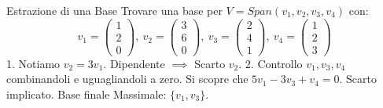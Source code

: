 \begin{example}{Estrazione di una Base}{}
Trovare una base per $V = Span(v_1, v_2, v_3, v_4)$ con:
$$
v_1 = \begin{pmatrix} 1 \\ 2 \\ 0 \end{pmatrix}, \ v_2 = \begin{pmatrix} 3 \\ 6 \\ 0 \end{pmatrix}, \ v_3 = \begin{pmatrix} 2 \\ 4 \\ 1 \end{pmatrix}, \ v_4 = \begin{pmatrix} 1 \\ 2 \\ 3 \end{pmatrix}
$$
1. Notiamo $v_2 = 3v_1$. Dipendente $\implies$ Scarto $v_2$.
2. Controllo $v_1, v_3, v_4$ combinandoli e uguagliandoli a zero. Si scopre che $5v_1 - 3v_3 + v_4 = 0$. Scarto implicato.
Base finale Massimale: $\{v_1, v_3\}$.
\end{example}
